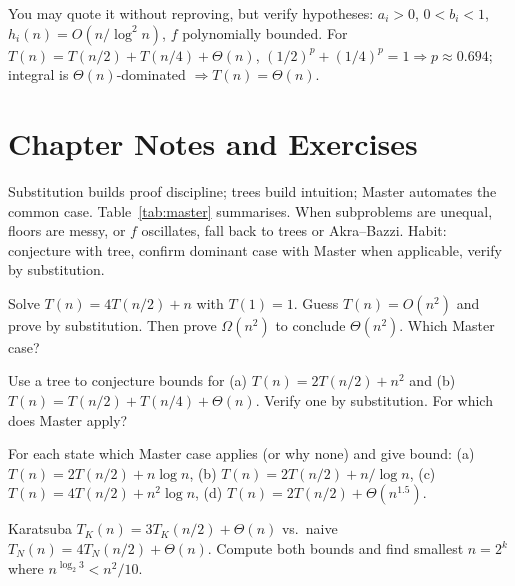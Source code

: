 \begin{remark}
You may quote it without reproving, but verify hypotheses: $a_{i}>0$, $0<b_{i}<1$, $h_{i}(n)=O(n/\log^{2}n)$, $f$ polynomially bounded. For $T(n)=T(n/2)+T(n/4)+\Theta(n)$, $(1/2)^{p}+(1/4)^{p}=1\Rightarrow p\approx0.694$; integral is $\Theta(n)$-dominated $\Rightarrow T(n)=\Theta(n)$.
\end{remark}

\section{Chapter Notes and Exercises}
Substitution builds proof discipline; trees build intuition; Master automates the common case. Table~\ref{tab:master} summarises. When subproblems are unequal, floors are messy, or $f$ oscillates, fall back to trees or Akra--Bazzi. Habit: conjecture with tree, confirm dominant case with Master when applicable, verify by substitution.

\begin{exercise}
Solve $T(n)=4T(n/2)+n$ with $T(1)=1$. Guess $T(n)=O(n^{2})$ and prove by substitution. Then prove $\Omega(n^{2})$ to conclude $\Theta(n^{2})$. Which Master case?
\end{exercise}
\begin{exercise}
Use a tree to conjecture bounds for (a) $T(n)=2T(n/2)+n^{2}$ and (b) $T(n)=T(n/2)+T(n/4)+\Theta(n)$. Verify one by substitution. For which does Master apply?
\end{exercise}
\begin{exercise}
For each state which Master case applies (or why none) and give bound: (a) $T(n)=2T(n/2)+n\log n$, (b) $T(n)=2T(n/2)+n/\log n$, (c) $T(n)=4T(n/2)+n^{2}\log n$, (d) $T(n)=2T(n/2)+\Theta(n^{1.5})$.
\end{exercise}
\begin{exercise}
Karatsuba $T_{K}(n)=3T_{K}(n/2)+\Theta(n)$ vs.\ naive $T_{N}(n)=4T_{N}(n/2)+\Theta(n)$. Compute both bounds and find smallest $n=2^{k}$ where $n^{\log_{2}3}<n^{2}/10$.
\end{exercise}
